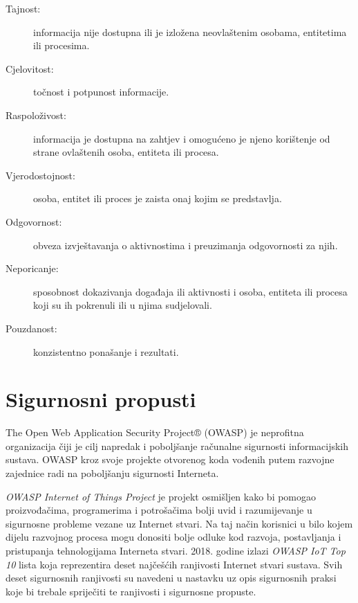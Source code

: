 \documentclass[times, utf8, diplomski]{fer}
\begin{document}
\begin{description}
    \item[Tajnost:]informacija nije dostupna ili je izložena  neovlaštenim osobama, entitetima ili procesima.
    \item[Cjelovitost:]točnost i potpunost informacije.
    \item[Raspoloživost:]informacija je dostupna na zahtjev i omogućeno je njeno korištenje od strane ovlaštenih osoba, entiteta ili procesa.
    \item[Vjerodostojnost:]osoba, entitet ili proces je zaista onaj kojim se predstavlja.
    \item[Odgovornost:]obveza izvještavanja o aktivnostima i preuzimanja odgovornosti za njih.
    \item[Neporicanje:]sposobnost dokazivanja događaja ili aktivnosti i osoba, entiteta ili procesa koji su ih pokrenuli ili u njima sudjelovali.
    \item[Pouzdanost:]konzistentno ponašanje i rezultati.
\end{description}

\section{Sigurnosni propusti}
The Open Web Application Security Project® (OWASP) je neprofitna organizacija čiji je cilj napredak i poboljšanje računalne sigurnosti informacijskih sustava. OWASP kroz svoje projekte otvorenog koda vođenih putem razvojne zajednice radi na poboljšanju sigurnosti Interneta.

\emph{OWASP Internet of Things Project} je projekt osmišljen kako bi pomogao proizvođačima, programerima i potrošačima bolji uvid i razumijevanje u sigurnosne probleme vezane uz Internet stvari. Na taj način korisnici u bilo kojem dijelu razvojnog procesa mogu donositi bolje odluke kod razvoja, postavljanja i pristupanja tehnologijama Interneta stvari\citep{owasp1}. 2018. godine izlazi \emph{OWASP IoT Top 10} lista koja reprezentira deset najčešćih ranjivosti Internet stvari sustava. Svih deset sigurnosnih ranjivosti su navedeni u nastavku uz opis sigurnosnih praksi koje bi trebale spriječiti te ranjivosti i sigurnosne propuste. 
\end{document}
